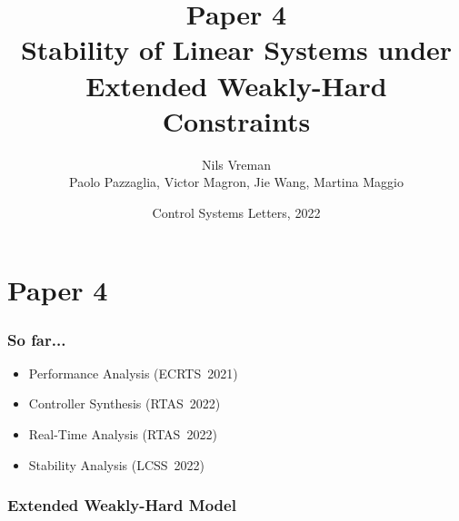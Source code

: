 \section{Paper 4}

\title[Preperatory Seminar]{
    {\Huge Paper 4} \\
    \vspace{2mm}
    {\Large Stability of Linear Systems under\\Extended Weakly-Hard Constraints} \\
}
\author[Nils Vreman]{
    Nils Vreman \\
    \vspace{3mm}
    {\large Paolo Pazzaglia, Victor Magron, Jie Wang, Martina Maggio}
}
\date[LCSS 2022]{
    Control Systems Letters, 2022\\
}
\notitlelogo
{}

\begin{frame}
    \frametitle{So far...}
    \begin{itemize}
        \item Performance Analysis (ECRTS~2021)
        \item Controller Synthesis (RTAS~2022)
        \item Real-Time Analysis (RTAS~2022)
        \item<2> \textcolor{lqgcolour}{Stability Analysis (LCSS~2022)}
    \end{itemize}
\end{frame}

\begin{frame}
    \frametitle{Extended Weakly-Hard Model}
    \begin{figure}[h]
        \centering
    \end{figure}
\end{frame}

